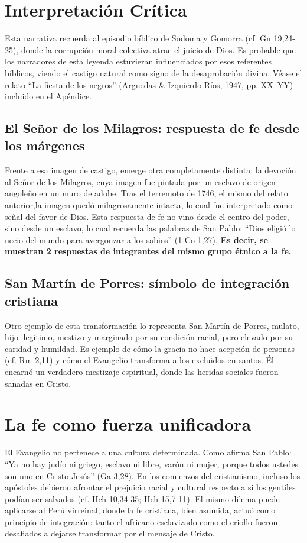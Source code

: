 \documentclass[a4paper,12pt]{article}
\begin{document}
	\section{Interpretaci\'on Cr\'itica}Esta narrativa recuerda al episodio bíblico de Sodoma y Gomorra (cf. Gn 19,24-25), donde la corrupción moral colectiva atrae el juicio de Dios. Es probable que los narradores de esta leyenda estuvieran influenciados por esos referentes bíblicos, viendo el castigo natural como signo de la desaprobación divina. Véase el relato “La fiesta de los negros” (Arguedas \& Izquierdo Ríos, 1947, pp. XX–YY) incluido en el Apéndice.
	
	\subsection{El Señor de los Milagros: respuesta de fe desde los márgenes}
	Frente a esa imagen de castigo, emerge otra completamente distinta: la devoción al Señor de los Milagros, cuya imagen fue pintada por un esclavo de origen angoleño en un muro de adobe. Tras el terremoto de 1746, el mismo del relato anterior,la imagen quedó milagrosamente intacta, lo cual fue interpretado como señal del favor de Dios. Esta respuesta de fe no vino desde el centro del poder, sino desde un esclavo, lo cual recuerda las palabras de San Pablo: “Dios eligió lo necio del mundo para avergonzar a los sabios” (1 Co 1,27). \textbf{Es decir, se muestran 2 respuestas de integrantes del mismo grupo \'etnico a la fe.
	}
	\subsection{San Martín de Porres: símbolo de integración cristiana}
	Otro ejemplo de esta transformación lo representa San Martín de Porres, mulato, hijo ilegítimo, mestizo y marginado por su condición racial, pero elevado por su caridad y humildad. Es ejemplo de cómo la gracia no hace acepción de personas (cf. Rm 2,11) y cómo el Evangelio transforma a los excluidos en santos. Él encarnó un verdadero mestizaje espiritual, donde las heridas sociales fueron sanadas en Cristo.
	
	\section{La fe como fuerza unificadora}
	El Evangelio no pertenece a una cultura determinada. Como afirma San Pablo: “Ya no hay judío ni griego, esclavo ni libre, varón ni mujer, porque todos ustedes son uno en Cristo Jesús” (Ga 3,28). En los comienzos del cristianismo, incluso los apóstoles debieron afrontar el prejuicio racial y cultural respecto a si los gentiles podían ser salvados (cf. Hch 10,34-35; Hch 15,7-11). El mismo dilema puede aplicarse al Perú virreinal, donde la fe cristiana, bien asumida, actuó como principio de integración: tanto el africano esclavizado como el criollo fueron desafiados a dejarse transformar por el mensaje de Cristo.
		
\end{document}
